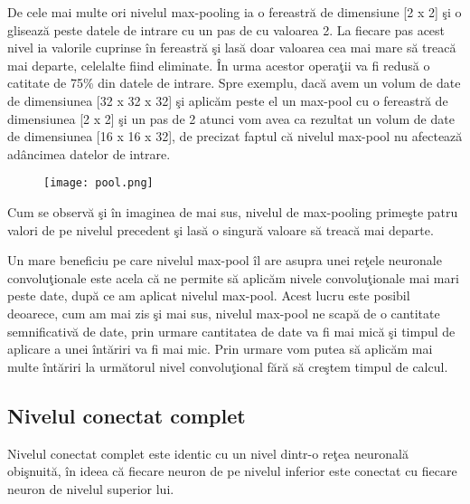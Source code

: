 \par

De cele mai multe ori nivelul max-pooling ia o fereastr\u{a} de dimensiune [2 x 2] \c{s}i o gliseaz\u{a} peste datele de intrare cu un pas de cu valoarea 2. La fiecare pas acest nivel ia valorile cuprinse \^{i}n fereastr\u{a} \c{s}i las\u{a} doar valoarea cea mai mare s\u{a} treac\u{a} mai departe, celelalte fiind eliminate. \^{I}n urma acestor opera\c{t}ii va fi redus\u{a} o catitate de 75\% din datele de intrare. Spre exemplu, dac\u{a} avem un volum de date de dimensiunea [32 x 32 x 32] \c{s}i aplic\u{a}m peste el un max-pool cu o fereastr\u{a} de dimensiunea [2 x 2] \c{s}i un pas de 2 atunci vom avea ca rezultat un volum de date de dimensiunea [16 x 16 x 32], de precizat faptul c\u{a} nivelul max-pool nu afecteaz\u{a} ad\^{a}ncimea datelor de intrare.

\begin{figure}[h!]
  \centering
  \texttt{[image: pool.png]}
\end{figure}

Cum se observ\u{a} \c{s}i \^{i}n imaginea de mai sus, nivelul de max-pooling prime\c{s}te patru valori de pe nivelul precedent \c{s}i las\u{a} o singur\u{a} valoare s\u{a} treac\u{a} mai departe.

Un mare beneficiu pe care nivelul max-pool \^{i}l are asupra unei re\c{t}ele neuronale convolu\c{t}ionale este acela c\u{a} ne permite s\u{a} aplic\u{a}m nivele convolu\c{t}ionale mai mari peste date, dup\u{a} ce am aplicat nivelul max-pool. Acest lucru este posibil deoarece, cum am mai zis \c{s}i mai sus, nivelul max-pool ne scap\u{a} de o cantitate semnificativ\u{a} de date, prin urmare cantitatea de date va fi mai mic\u{a} \c{s}i timpul de aplicare a unei \^{i}nt\u{a}riri va fi mai mic. Prin urmare vom putea s\u{a} aplic\u{a}m mai multe \^{i}nt\u{a}riri la urm\u{a}torul nivel convolu\c{t}ional f\u{a}r\u{a} s\u{a} cre\c{s}tem timpul de calcul.

\subsection{Nivelul conectat complet}

Nivelul conectat complet este identic cu un nivel dintr-o re\c{t}ea neuronal\u{a} obi\c{s}nuit\u{a}, \^{i}n ideea c\u{a} fiecare neuron de pe nivelul inferior este conectat cu fiecare neuron de nivelul superior lui.

\par

